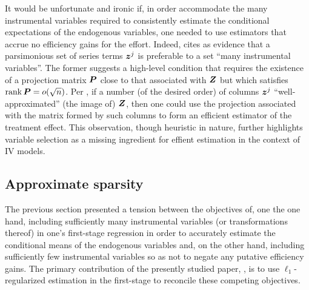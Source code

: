 \documentclass{uwstat572}
\theoremstyle{definition}
\theoremstyle{remark}
\newcommand{\rank}{\mathrm{rank} \,}
\numberwithin{equation}{section}
\begin{document}
It would be unfortunate and ironic if, in order accommodate the many instrumental variables required to consistently estimate the conditional expectations of the endogenous variables, one needed to use estimators that accrue no efficiency gains for the effort. Indeed, \cite{H02} cites \cite{N97} as evidence that a parsimonious set of series terms $\z^j$ is preferable to a set ``many instrumental variables''. The former suggests a high-level condition that requires the existence of a projection matrix $\P$ close to that associated with $\Z$ but which satisfies $\rank \P = o(\sqrt{n})$. Per \cite{H02}, if a number (of the desired order) of columns $\z^j$ ``well-approximated'' (the image of) $\Z$, then one could use the projection associated with the matrix formed by such columns to form an efficient estimator of the treatment effect. This observation, though heuristic in nature, further highlights variable selection as a missing ingredient for effient estimation in the context of IV models.


%
\subsection{Approximate sparsity}


The previous section presented a tension between the objectives of, one the one hand, including sufficiently many instrumental variables (or transformations thereof) in one's first-stage regression in order to accurately estimate the conditional means of the endogenous variables and, on the other hand, including sufficiently few instrumental variables so as not to negate any putative efficiency gains. The primary contribution of the presently studied paper, \cite{BCH11}, is to use $\ell_1$-regularized estimation in the first-stage to reconcile these competing objectives. 
\end{document}

